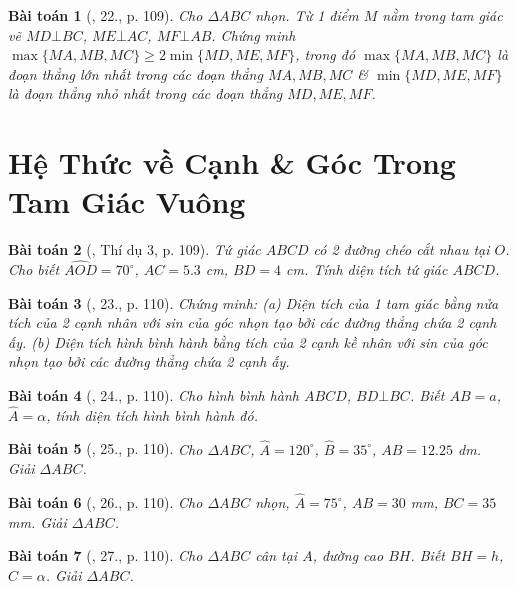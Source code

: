 \documentclass{article}
\newtheorem{baitoan}{Bài toán}
\begin{document}
\begin{baitoan}[\cite{Tuyen_Toan_9}, 22., p. 109]
	Cho $\Delta ABC$ nhọn. Từ 1 điểm $M$ nằm trong tam giác vẽ $MD\bot BC$, $ME\bot AC$, $MF\bot AB$. Chứng minh $\max\{MA,MB,MC\}\ge2\min\{MD,ME,MF\}$, trong đó $\max\{MA,MB,MC\}$ là đoạn thẳng lớn nhất trong các đoạn thẳng $MA,MB,MC$ \& $\min\{MD,ME,MF\}$ là đoạn thẳng nhỏ nhất trong các đoạn thẳng $MD,ME,MF$.
\end{baitoan}


\section{Hệ Thức về Cạnh \& Góc Trong Tam Giác Vuông}

\begin{baitoan}[\cite{Tuyen_Toan_9}, Thí dụ 3, p. 109]
	Tứ giác $ABCD$ có 2 đường chéo cắt nhau tại $O$. Cho biết $\widehat{AOD} = 70^\circ$, $AC = 5.3$ {\rm cm}, $BD = 4$ {\rm cm}. Tính diện tích tứ giác $ABCD$.
\end{baitoan}

\begin{baitoan}[\cite{Tuyen_Toan_9}, 23., p. 110]
	Chứng minh: (a) Diện tích của 1 tam giác bằng nửa tích của 2 cạnh nhân với sin của góc nhọn tạo bởi các đường thẳng chứa 2 cạnh ấy. (b) Diện tích hình bình hành bằng tích của 2 cạnh kề nhân với sin của góc nhọn tạo bởi các đường thẳng chứa 2 cạnh ấy.
\end{baitoan}

\begin{baitoan}[\cite{Tuyen_Toan_9}, 24., p. 110]
	Cho hình bình hành $ABCD$, $BD\bot BC$. Biết $AB = a$, $\widehat{A} = \alpha$, tính diện tích hình bình hành đó.
\end{baitoan}

\begin{baitoan}[\cite{Tuyen_Toan_9}, 25., p. 110]
	Cho $\Delta ABC$, $\widehat{A} = 120^\circ$, $\widehat{B} = 35^\circ$, $AB = 12.25$ {\rm dm}. Giải $\Delta ABC$.
\end{baitoan}

\begin{baitoan}[\cite{Tuyen_Toan_9}, 26., p. 110]
	Cho $\Delta ABC$ nhọn, $\widehat{A} = 75^\circ$, $AB = 30$ {\rm mm}, $BC = 35$ {\rm mm}. Giải $\Delta ABC$.
\end{baitoan}

\begin{baitoan}[\cite{Tuyen_Toan_9}, 27., p. 110]
	Cho $\Delta ABC$ cân tại $A$, đường cao $BH$. Biết $BH = h$, $\widehat{C} = \alpha$. Giải $\Delta ABC$.
\end{baitoan}
\end{document}
